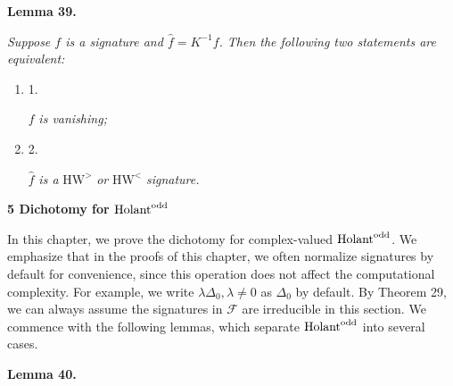 

\par\medskip\noindent\textbf{
\textbf{Lemma 39}\textbf{.}
}\par



\emph{Suppose $f$ is a signature and $\widehat{f}=K^{-1}f$. Then the following two statements are equivalent:}\par


\begin{enumerate}


\item[] 
1. 


$f$\emph{ is vanishing;}\par





\item[] 
2. 


$\widehat{f}$\emph{ is a }$\text{HW}^{>}$\emph{ or }$\text{HW}^{<}$\emph{ signature.}\par





\end{enumerate}







\par\medskip\noindent\textbf{
5 Dichotomy for $\textup{{Holant}}^{\text{odd}}$
}\par




In this chapter, we prove the dichotomy for complex-valued $\textup{{Holant}}^{\text{odd}}$. We emphasize that in the proofs of this chapter, we often normalize signatures by default for convenience, since this operation does not affect the computational complexity. For example, we write $\lambda\Delta_{0},\lambda\neq 0$ as $\Delta_{0}$ by default.
By Theorem 29, we can always assume the signatures in $\mathcal{F}$ are irreducible in this section. We commence with the following lemmas, which separate $\textup{{Holant}}^{\text{odd}}$ into several cases.\par





\par\medskip\noindent\textbf{
\textbf{Lemma 40}\textbf{.}
}\par



